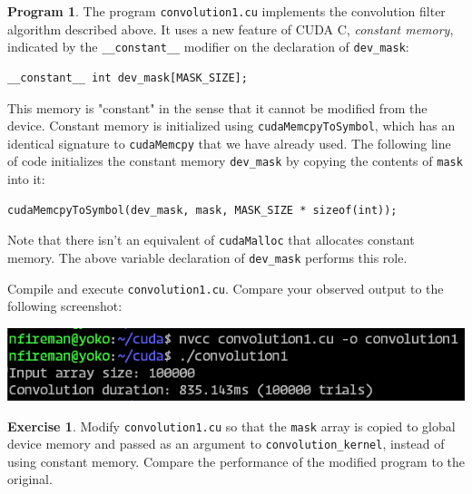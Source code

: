 \documentclass{article}
\theoremstyle{definition}
\newtheorem{program}{Program}
\newtheorem{exercise}{Exercise}
\begin{document}
\begin{program}
The program \texttt{convolution1.cu} implements the convolution filter algorithm described above. It uses a new feature of CUDA C, \emph{constant memory}, indicated by the \texttt{\_\_constant\_\_} modifier on the declaration of \texttt{dev\_mask}:

\begin{verbatim}
__constant__ int dev_mask[MASK_SIZE];
\end{verbatim}

This memory is "constant" in the sense that it cannot be modified from the device. Constant memory is initialized using \texttt{cudaMemcpyToSymbol}, which has an identical signature to \texttt{cudaMemcpy} that we have already used. The following line of code initializes the constant memory \texttt{dev\_mask} by copying the contents of \texttt{mask} into it:

\begin{verbatim}
cudaMemcpyToSymbol(dev_mask, mask, MASK_SIZE * sizeof(int));
\end{verbatim}

Note that there isn't an equivalent of \texttt{cudaMalloc} that allocates constant memory. The above variable declaration of \texttt{dev\_mask} performs this role. 

Compile and execute \texttt{convolution1.cu}. Compare your observed output to the following screenshot:

\includegraphics[width=\textwidth]{images/convolution1-output.png}

\end{program}

\begin{exercise}
Modify \texttt{convolution1.cu} so that the \texttt{mask} array is copied to global device memory and passed as an argument to \texttt{convolution\_kernel}, instead of using constant memory. Compare the performance of the modified program to the original.
\end{exercise}
\end{document}
